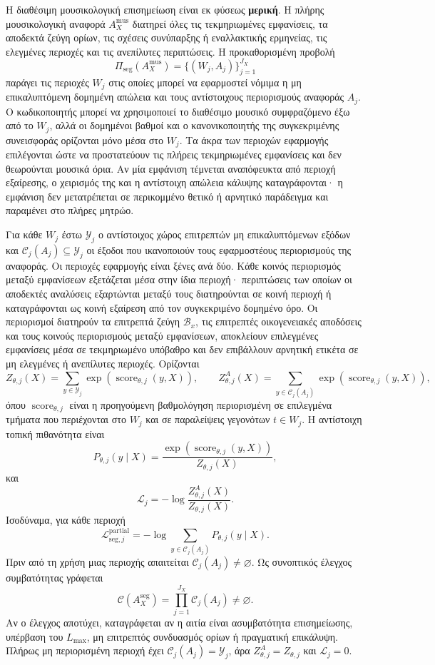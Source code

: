\documentclass[11pt,a4paper]{article}
\begin{document}
Η διαθέσιμη μουσικολογική επισημείωση είναι εκ φύσεως \textbf{μερική}. Η πλήρης μουσικολογική αναφορά $A_X^{\mathrm{mus}}$ διατηρεί όλες τις τεκμηριωμένες εμφανίσεις, τα αποδεκτά ζεύγη ορίων, τις σχέσεις συνύπαρξης ή εναλλακτικής ερμηνείας, τις ελεγμένες περιοχές και τις ανεπίλυτες περιπτώσεις. Η προκαθορισμένη προβολή
\[
\Pi_{\mathrm{seg}}(A_X^{\mathrm{mus}})
=\{(W_j,A_j)\}_{j=1}^{J_X}
\]
παράγει τις περιοχές $W_j$ στις οποίες μπορεί να εφαρμοστεί νόμιμα η μη επικαλυπτόμενη δομημένη απώλεια και τους αντίστοιχους περιορισμούς αναφοράς $A_j$. Ο κωδικοποιητής μπορεί να χρησιμοποιεί το διαθέσιμο μουσικό συμφραζόμενο έξω από το $W_j$, αλλά οι δομημένοι βαθμοί και ο κανονικοποιητής της συγκεκριμένης συνεισφοράς ορίζονται μόνο μέσα στο $W_j$. Τα άκρα των περιοχών εφαρμογής επιλέγονται ώστε να προστατεύουν τις πλήρεις τεκμηριωμένες εμφανίσεις και δεν θεωρούνται μουσικά όρια. Αν μία εμφάνιση τέμνεται αναπόφευκτα από περιοχή εξαίρεσης, ο χειρισμός της και η αντίστοιχη απώλεια κάλυψης καταγράφονται· η εμφάνιση δεν μετατρέπεται σε περικομμένο θετικό ή αρνητικό παράδειγμα και παραμένει στο πλήρες μητρώο.

Για κάθε $W_j$ έστω $\mathcal Y_j$ ο αντίστοιχος χώρος επιτρεπτών μη επικαλυπτόμενων εξόδων και $\mathcal C_j(A_j)\subseteq\mathcal Y_j$ οι έξοδοι που ικανοποιούν τους εφαρμοστέους περιορισμούς της αναφοράς. Οι περιοχές εφαρμογής είναι ξένες ανά δύο. Κάθε κοινός περιορισμός μεταξύ εμφανίσεων εξετάζεται μέσα στην ίδια περιοχή· περιπτώσεις των οποίων οι αποδεκτές αναλύσεις εξαρτώνται μεταξύ τους διατηρούνται σε κοινή περιοχή ή καταγράφονται ως κοινή εξαίρεση από τον συγκεκριμένο δομημένο όρο. Οι περιορισμοί διατηρούν τα επιτρεπτά ζεύγη $\mathcal B_x$, τις επιτρεπτές οικογενειακές αποδόσεις και τους κοινούς περιορισμούς μεταξύ εμφανίσεων, αποκλείουν επιλεγμένες εμφανίσεις μέσα σε τεκμηριωμένο υπόβαθρο και δεν επιβάλλουν αρνητική ετικέτα σε μη ελεγμένες ή ανεπίλυτες περιοχές. Ορίζονται
\[
Z_{\theta,j}(X)=
\sum_{y\in\mathcal Y_j}
\exp\!\left(\operatorname{score}_{\theta,j}(y,X)\right),
\qquad
Z_{\theta,j}^{A}(X)=
\sum_{y\in\mathcal C_j(A_j)}
\exp\!\left(\operatorname{score}_{\theta,j}(y,X)\right),
\]
όπου $\operatorname{score}_{\theta,j}$ είναι η προηγούμενη βαθμολόγηση περιορισμένη σε επιλεγμένα τμήματα που περιέχονται στο $W_j$ και σε παραλείψεις γεγονότων $t\in W_j$. Η αντίστοιχη τοπική πιθανότητα είναι
\[
P_{\theta,j}(y\mid X)=
\frac{\exp\!\left(\operatorname{score}_{\theta,j}(y,X)\right)}
{Z_{\theta,j}(X)},
\]
και
\[
\mathcal L_j
=-\log\frac{Z_{\theta,j}^{A}(X)}{Z_{\theta,j}(X)}.
\]
Ισοδύναμα, για κάθε περιοχή
\[
\mathcal L_{\mathrm{seg},j}^{\mathrm{partial}}
=-\log\!\sum_{y\in\mathcal C_j(A_j)}P_{\theta,j}(y\mid X).
\]
Πριν από τη χρήση μιας περιοχής απαιτείται $\mathcal C_j(A_j)\neq\varnothing$. Ως συνοπτικός έλεγχος συμβατότητας γράφεται
\[
\mathcal C(A_X^{\mathrm{seg}})
=\prod_{j=1}^{J_X}\mathcal C_j(A_j)\neq\varnothing.
\]
Αν ο έλεγχος αποτύχει, καταγράφεται αν η αιτία είναι ασυμβατότητα επισημείωσης, υπέρβαση του $L_{\max}$, μη επιτρεπτός συνδυασμός ορίων ή πραγματική επικάλυψη. Πλήρως μη περιορισμένη περιοχή έχει $\mathcal C_j(A_j)=\mathcal Y_j$, άρα $Z_{\theta,j}^{A}=Z_{\theta,j}$ και $\mathcal L_j=0$.
\end{document}
